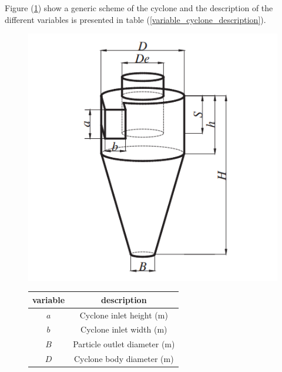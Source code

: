 Figure (\ref{cyclone_schema}) show a generic scheme of the cyclone and the description of the different variables is presented in table (\ref{variable_cyclone_description}).


\begin{figure}[H]
	\begin{minipage}[b]{.4\linewidth}
		\centering
		\includegraphics[width=1\linewidth]{images/schema.png}
		\captionsetup{font=bf, size=small}	
		\label{cyclone_schema}
	\end{minipage}\hfill
	\begin{minipage}[b]{.59\linewidth}
		\centering
	\begin{tabular}{cc}
		\hline
			\rule[-0.3cm]{0pt}{0.8cm}\textbf{variable} & \textbf{description}                                \\ \hline
			\rule[-0.3cm]{0pt}{0.8cm}$a$                 & Cyclone inlet height (m)                            \\ \hline
			\rule[-0.3cm]{0pt}{0.8cm}$b$                 & Cyclone inlet width (m)                             \\ \hline
			\rule[-0.3cm]{0pt}{0.8cm}$B$                 & Particle outlet diameter (m)                        \\ \hline
			\rule[-0.3cm]{0pt}{0.8cm}$D$                 & Cyclone body diameter (m)                           \\ \hline

\end{tabular}
\end{minipage}
\end{figure}
